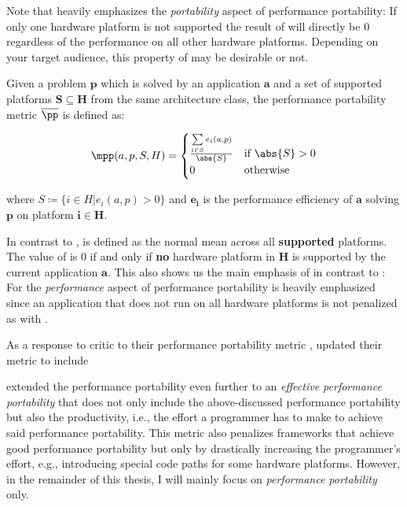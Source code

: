 Note that \pp heavily emphasizes the \textit{portability} aspect of performance portability: If only one hardware platform is not supported the result of \pp will directly be $0$ regardless of the performance on all other hardware platforms. 
Depending on your target audience, this property of \pp may be desirable or not. 

\cite{marowka_toward_2021, marowka_reformulation_2022, marowka_comparison_2023, marowka_portability_2024, marowka_inorrect_2024}


\begin{definition}\label{def:mpp}
    Given a problem $\mathbf{p}$ which is solved by an application $\mathbf{a}$ and a set of supported platforms $\mathbf{S \subseteq H}$ from the same architecture class, the performance portability metric $\overline{\pp}$ is defined as:

    \[ \mpp(a, p, S, H) = 
        \begin{cases}
            \frac{\sum\limits_{i \in S} e_i(a, p)}{\abs{S}} & \text{if }\abs{S} > 0 \\
            0                                               & \text{otherwise}
        \end{cases} 
    \]

    where $S \coloneqq \{ i \in H | e_i(a, p) > 0 \}$ and $\mathbf{e_i}$ is the performance efficiency of $\mathbf{a}$ solving $\mathbf{p}$ on platform $\mathbf{i \in H}$.
\end{definition}

In contrast to \pp, \mpp is defined as the normal mean across all \textbf{supported} platforms. 
The value of \mpp is $0$ if and only if \textbf{no} hardware platform in $\mathbf{H}$ is supported by the current application $\mathbf{a}$. 
This also shows us the main emphasis of \mpp in contrast to \pp: For \mpp the \textit{performance} aspect of performance portability is heavily emphasized since an application that does not run on all hardware platforms is not penalized as with \pp. 

As a response to \citeauthor{marowka_comparison_2023} critic to their performance portability metric \pp, \citet{pennycook_revisiting_2021} updated their metric to include 


\citet{harrell_effective_2018} extended the performance portability even further to an \textit{effective performance portability} that does not only include the above-discussed performance portability but also the productivity, i.e., the effort a programmer has to make to achieve said performance portability. 
This metric also penalizes frameworks that achieve good performance portability but only by drastically increasing the programmer's effort, e.g., introducing special code paths for some hardware platforms. 
However, in the remainder of this thesis, I will mainly focus on \textit{performance portability} only. 


